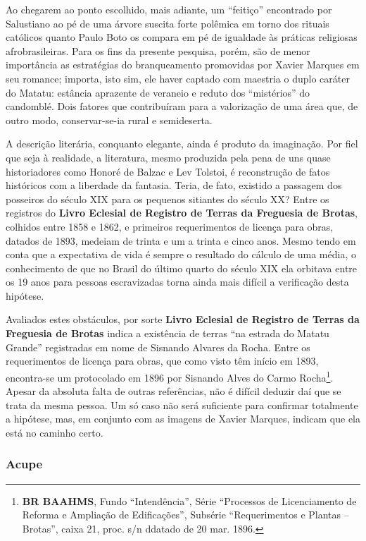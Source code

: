 Ao chegarem ao ponto escolhido, mais adiante, um ``feitiço'' encontrado por Salustiano ao pé de uma árvore suscita forte polêmica em torno dos rituais católicos quanto Paulo Boto os compara em pé de igualdade às práticas religiosas afrobrasileiras. Para os fins da presente pesquisa, porém, são de menor importância as estratégias do branqueamento promovidas por Xavier Marques em seu romance; importa, isto sim, ele haver captado com maestria o duplo caráter do Matatu: estância aprazente de veraneio e reduto dos ``mistérios'' do candomblé. Dois fatores que contribuíram para a valorização de uma área que, de outro modo, conservar-se-ia rural e semideserta.

A descrição literária, conquanto elegante, ainda é produto da imaginação. Por fiel que seja à realidade, a literatura, mesmo produzida pela pena de uns quase historiadores como Honoré de Balzac e Lev Tolstoi, é reconstrução de fatos históricos com a liberdade da fantasia. Teria, de fato, existido a passagem dos posseiros do século XIX para os pequenos sitiantes do século XX? Entre os registros do \textbf{Livro Eclesial de Registro de Terras da Freguesia de Brotas}, colhidos entre 1858 e 1862, e primeiros requerimentos de licença para obras, datados de 1893, medeiam de trinta e um a trinta e cinco anos. Mesmo tendo em conta que a expectativa de vida é sempre o resultado do cálculo de uma média, o conhecimento de que no Brasil do último quarto do século XIX ela orbitava entre os 19 anos para pessoas escravizadas \cite[p.~303]{schwartz_segredos_1988} torna ainda mais difícil a verificação desta hipótese.

Avaliados estes obstáculos, por sorte \textbf{Livro Eclesial de Registro de Terras da Freguesia de Brotas} indica a existência de terras ``na estrada do Matatu Grande'' registradas em nome de Sisnando Alvares da Rocha. Entre os requerimentos de licença para obras, que como visto têm início em 1893, encontra-se um protocolado em 1896 por Sisnando Alves do Carmo Rocha\footnote{\textbf{BR BAAHMS}, Fundo ``Intendência'', Série ``Processos de Licenciamento de Reforma e Ampliação de Edificações'', Subsérie ``Requerimentos e Plantas -- Brotas'', caixa 21, proc. s/n ddatado de 20 mar. 1896.}. Apesar da absoluta falta de outras referências, não é difícil deduzir daí que se trata da mesma pessoa. Um só caso não será suficiente para confirmar totalmente a hipótese, mas, em conjunto com as imagens de Xavier Marques, indicam que ela está no caminho certo.

\subsubsection{Acupe}\label{subsubsec:acupecap3}

